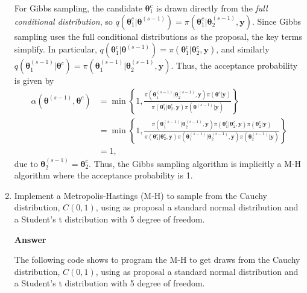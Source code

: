 \begin{enumerate}[leftmargin=*]
For Gibbs sampling, the candidate $\bm{\theta}^c_1$ is drawn directly from the \emph{full conditional distribution}, so $q(\bm{\theta}^c_1 | \bm{\theta}^{(s-1)}) = \pi(\bm{\theta}^c_1 | \bm{\theta}^{(s-1)}_2, \bm{y})$. Since Gibbs sampling uses the full conditional distributions as the proposal, the key terms simplify. In particular, $q(\bm{\theta}^c_1 | \bm{\theta}^{(s-1)}) = \pi(\bm{\theta}^c_1 | \bm{\theta}^{c}_2, \bm{y})$, and similarly $q(\bm{\theta}^{(s-1)}_1 | \bm{\theta}^c) = \pi(\bm{\theta}^{(s-1)}_1 | \bm{\theta}^{(s-1)}_2, \bm{y})$. Thus, the acceptance probability is given by 
\begin{align*}
	\alpha(\bm{\theta}^{(s-1)}, \bm{\theta}^c) & = \min\left\{ 1, \frac{\pi(\bm{\theta}^{(s-1)}_1 | \bm{\theta}_2^{(s-1)}, \bm{y}) \pi(\bm{\theta}^c | \bm{y})}{\pi(\bm{\theta}^c_1 | \bm{\theta}^{c}_2, \bm{y}) \pi(\bm{\theta}^{(s-1)} | \bm{y})} \right\}\\
	&= \min\left\{ 1, \frac{\pi(\bm{\theta}^{(s-1)}_1 | \bm{\theta}_2^{(s-1)}, \bm{y}) \pi(\bm{\theta}^c_1 | \bm{\theta}^c_2, \bm{y})\pi(\bm{\theta}^c_2 | \bm{y})}{\pi(\bm{\theta}^c_1 | \bm{\theta}^{c}_2, \bm{y}) \pi(\bm{\theta}^{(s-1)}_1 | \bm{\theta}^{(s-1)}_2, \bm{y}) \pi(\bm{\theta}^{(s-1)}_2 | \bm{y})} \right\}\\
	&=1,
\end{align*}
due to $\bm{\theta}^{(s-1)}_2=\bm{\theta}^{c}_2$. Thus, the Gibbs sampling algorithm is implicitly a M-H algorithm where the acceptance probability is 1.

\item Implement a Metropolis-Hastings (M-H) to sample from the Cauchy distribution, $C(0,1)$, using as proposal a standard normal distribution and a Student's t distribution with 5 degree of freedom. 

\textbf{Answer}

The following code shows to program the M-H to get draws from the Cauchy distribution, $C(0,1)$, using as proposal a standard normal distribution and a Student's t distribution with 5 degree of freedom.



\end{enumerate}

